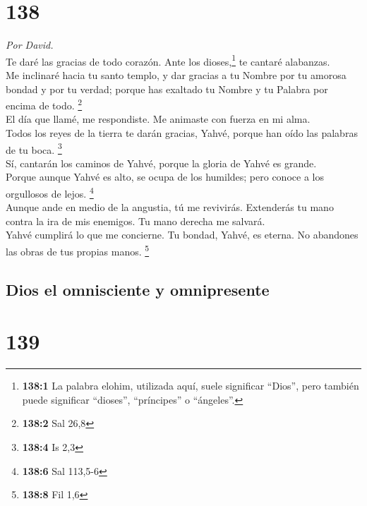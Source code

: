 \hypertarget{section-135}{%
\section{138}\label{section-135}}

\emph{Por David.}\\
 Te daré las gracias de todo corazón. Ante los
dioses,\footnote{\textbf{138:1} La palabra elohim, utilizada aquí, suele
  significar ``Dios'', pero también puede significar ``dioses'',
  ``príncipes'' o ``ángeles''.} te cantaré alabanzas.\\
 Me inclinaré hacia tu santo templo, y dar gracias a tu
Nombre por tu amorosa bondad y por tu verdad; porque has exaltado tu
Nombre y tu Palabra por encima de todo. \footnote{\textbf{138:2} Sal
  26,8}\\
 El día que llamé, me respondiste. Me animaste con fuerza
en mi alma.\\
 Todos los reyes de la tierra te darán gracias, Yahvé,
porque han oído las palabras de tu boca. \footnote{\textbf{138:4} Is 2,3}\\
 Sí, cantarán los caminos de Yahvé, porque la gloria de
Yahvé es grande.\\
 Porque aunque Yahvé es alto, se ocupa de los humildes;
pero conoce a los orgullosos de lejos. \footnote{\textbf{138:6} Sal
  113,5-6}\\
 Aunque ande en medio de la angustia, tú me revivirás.
Extenderás tu mano contra la ira de mis enemigos. Tu mano derecha me
salvará.\\
 Yahvé cumplirá lo que me concierne. Tu bondad, Yahvé, es
eterna. No abandones las obras de tus propias manos. \footnote{\textbf{138:8}
  Fil 1,6}

\hypertarget{dios-el-omnisciente-y-omnipresente}{%
\subsection{Dios el omnisciente y
omnipresente}\label{dios-el-omnisciente-y-omnipresente}}

\hypertarget{section-136}{%
\section{139}\label{section-136}}

